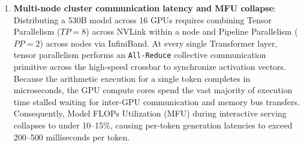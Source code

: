 \documentclass[../../main.tex]{subfiles}
\begin{document}
\begin{enumerate}
    For a 530B-parameter model stored in 16-bit floating point precision (FP16 or BF16, at 2 bytes per parameter), the static weight footprint alone is:
    \begin{equation}
    \label{eq:weight_memory_footprint}
    M_{\text{weights}} = 530 \times 10^9 \times 2 \text{ bytes} \approx 1,060 \text{ GB} = 1.06 \text{ TB}.
    \end{equation}
    On standard NVIDIA A100 GPUs (equipped with 80~GB HBM2e memory), storing merely the static weights requires a strict theoretical minimum of $\lceil 1060 / 80 \rceil = 14$ GPUs, realistically requiring a full server pod of 16 A100 GPUs.
    Furthermore, serving concurrent user requests requires allocating high-speed memory for the dynamic Key-Value (KV) cache across all layers and attention heads:
    \begin{equation}
    \label{eq:kv_cache_memory}
    M_{\text{KV}} = 2 \times B \times L \times d \times T_{\text{ctx}} \times 2 \text{ bytes},
    \end{equation}
    where $B$ is batch size, $L=105$ layers, $d=20,480$, and $T_{\text{ctx}}$ is context length. For a modest batch size of $B=16$ at $T_{\text{ctx}}=2048$, the KV cache requires an additional $\approx 280\text{ GB}$ of VRAM, pushing total memory consumption beyond $1.34\text{ TB}$.

    \item \textbf{Multi-node cluster communication latency and MFU collapse}:
    Distributing a 530B model across 16 GPUs requires combining Tensor Parallelism ($TP=8$) across NVLink within a node and Pipeline Parallelism ($PP=2$) across nodes via InfiniBand. At every single Transformer layer, tensor parallelism performs an \texttt{All-Reduce} collective communication primitive across the high-speed crossbar to synchronize activation vectors.
    Because the arithmetic execution for a single token completes in microseconds, the GPU compute cores spend the vast majority of execution time stalled waiting for inter-GPU communication and memory bus transfers. Consequently, Model FLOPs Utilization (MFU) during interactive serving collapses to under 10--15\%, causing per-token generation latencies to exceed 200--500 milliseconds per token.


\end{enumerate}
\end{document}
